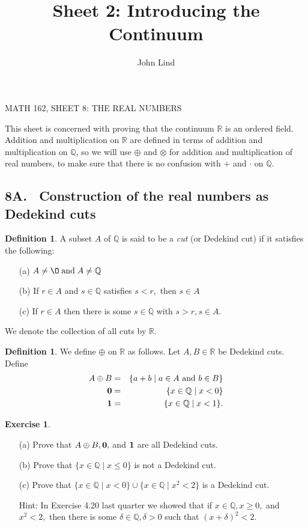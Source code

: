 \documentclass[12pt]{article}
\title{Sheet 2: Introducing the Continuum}
\author{John Lind}
\newcommand{\bbQ}{\mathbb{Q}}
\newcommand{\bbR}{\mathbb{R}}
\renewcommand{\emptyset}{\O}
\renewcommand{\_}[1]{\underline{ #1 }}
\theoremstyle{definition}
\newtheorem{definition}[theorem]{Definition}
\newtheorem{exercise}[theorem]{Exercise}
\numberwithin{equation}{subsection}
\begin{document}
\begin{center}
{\large MATH 162, SHEET 8: THE REAL NUMBERS} \\ 
\vspace{.2in}  

\end{center}

\bigskip \bigskip

This sheet is concerned with proving that the continuum $\bbR$ is an ordered field. Addition and multiplication on $\bbR$ are defined in terms of addition and multiplication on $\bbQ$, so we will use $\oplus  $ and $\otimes  $ for addition and multiplication of real numbers, to make sure that there is no confusion with $+$ and $\cdot$ on $\bbQ.$

\setcounter{section}{8}   

\subsection*{8A. \ Construction of the real numbers as Dedekind cuts}

\begin{definition} 
A subset $A$ of $\bbQ$ is said to be a {\it cut} (or Dedekind cut) if it satisfies the following:
\begin{itemize}
\item[(a)] $A\neq \emptyset\;\mbox{and}\; A\neq {\mathbb Q}$
\item[(b)] If $r\in A$ and $s\in\bbQ$ satisfies $s<r,$ then $s\in A$
\item[(c)] If $r\in A$ then there is some $s\in\bbQ$ with $s>r, s\in A.$ 
\end{itemize}
We denote the collection of all cuts by $\bbR$.
\end{definition}

\begin{definition}
We define $\oplus $ on $\bbR$ as follows. Let $A,B\in\bbR$ be Dedekind cuts. Define
\begin{eqnarray*}
A \oplus B & = & \{a+b\mid a\in A\text{ and }b\in B\}\\
{\bf 0} & = & \{x\in\bbQ\mid x<0\}\\
{\bf 1} & = & \{x\in\bbQ\mid x<1\}.
\end{eqnarray*}
\end{definition}

\begin{exercise}
\begin{itemize}
\item[(a)] Prove that $A\oplus  B,{\bf 0},$ and ${\bf 1}$ are all Dedekind cuts.
\item[(b)] Prove that $\{x\in\bbQ\mid x\leq 0\}$ is not a Dedekind cut.
\item[(c)] Prove that $\{x\in\bbQ\mid x<0\}\cup\{x\in\bbQ\mid x^2<2\}$ is a Dedekind cut.

Hint: In Exercise 4.20 last quarter we showed that if $x\in\bbQ, x\geq 0,$ and $x^2<2,$ then there is some $\delta\in\bbQ, \delta>0$ such that $(x+\delta)^2<2.$
\end{itemize}
\end{exercise}
\end{document}
